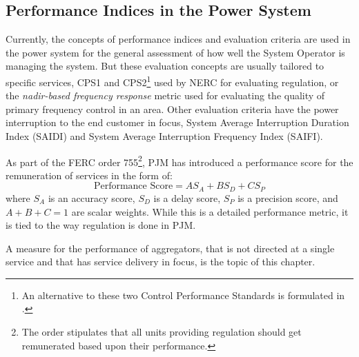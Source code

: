 \subsection{Performance Indices in the Power System}
Currently, the concepts of performance indices and evaluation criteria are used in the power system for the general assessment of how well the System Operator is managing the system. But these evaluation concepts are usually tailored to specific services, \eg CPS1 and CPS2\footnote{An alternative to these two Control Performance Standards is formulated in \cite{gross2001analysis}.} used by NERC for evaluating regulation, or the \emph{nadir-based frequency response} metric used for evaluating the quality of primary frequency control in an area. Other evaluation criteria have the power interruption to the end customer in focus, \eg System Average Interruption Duration Index (SAIDI) and System Average Interruption Frequency Index (SAIFI). 

As part of the FERC order 755\footnote{The order stipulates that all units providing regulation should get remunerated based upon their performance.}, PJM has introduced a performance score for the remuneration of services in the form of:
\begin{equation}
	\text{Performance Score} = A S_A + B S_D +C S_P
\end{equation}
where $S_A$ is an accuracy score, $S_D$ is a delay score, $S_P$ is a precision score, and $A+B+C =1$ are scalar weights. While this is a detailed performance metric, it is tied to the way regulation is done in PJM.

A measure for the performance of aggregators, that is not directed at a single service and that has service delivery in focus, is the topic of this chapter.

